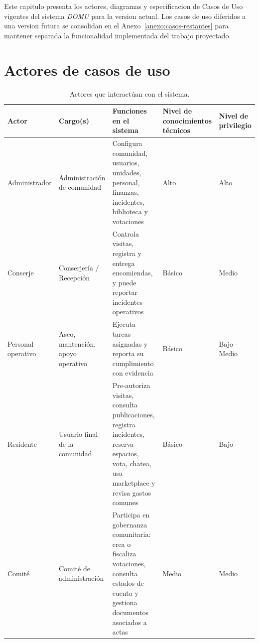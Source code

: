
\newcommand{\cutop}[2]{%
  \multicolumn{2}{|l|}{\textbf{#1\;\;#2}}\\\hline
}
\newcommand{\cusec}[2]{%
  \multicolumn{2}{|p{0.96\linewidth}|}{\textbf{#1:}\;#2}\\\hline
}
\newcommand{\cuheader}[2]{\textbf{#1} & \textbf{#2}\\\hline}

\begingroup
\small
\setlength{\tabcolsep}{4pt}
\renewcommand{\arraystretch}{1.08}

\label{cap:analisis}

\noindent Este capitulo presenta los actores, diagramas y especificacion de Casos de Uso vigentes del sistema \textit{DOMU} para la version actual. Los casos de uso diferidos a una version futura se consolidan en el Anexo~\ref{anexo:casos-restantes} para mantener separada la funcionalidad implementada del trabajo proyectado.

\section{Actores de casos de uso}

\begin{table}[H]
\centering
\small
\renewcommand{\arraystretch}{1.15}

\begin{tabularx}{\linewidth}{|p{2.5cm}|p{3cm}|X|p{3cm}|p{2.5cm}|}
\hline
\textbf{Actor} & \textbf{Cargo(s)} & \textbf{Funciones en el sistema} &
\textbf{Nivel de conocimientos técnicos} & \textbf{Nivel de privilegio} \\\hline

Administrador & Administración de comunidad & Configura comunidad, usuarios, unidades, personal, finanzas, incidentes, biblioteca y votaciones & Alto & Alto \\\hline

Conserje & Conserjería / Recepción & Controla visitas, registra y entrega encomiendas, y puede reportar incidentes operativos & Básico & Medio \\\hline

Personal operativo & Aseo, mantención, apoyo operativo & Ejecuta tareas asignadas y reporta su cumplimiento con evidencia & Básico & Bajo--Medio \\\hline

Residente & Usuario final de la comunidad & Pre-autoriza visitas, consulta publicaciones, registra incidentes, reserva espacios, vota, chatea, usa marketplace y revisa gastos comunes & Básico & Bajo \\\hline

Comité & Comité de administración & Participa en gobernanza comunitaria: crea o fiscaliza votaciones, consulta estados de cuenta y gestiona documentos asociados a actas & Medio & Medio \\\hline

\end{tabularx}

\caption{Actores que interactúan con el sistema.}
\label{tab:actores}
\end{table}

